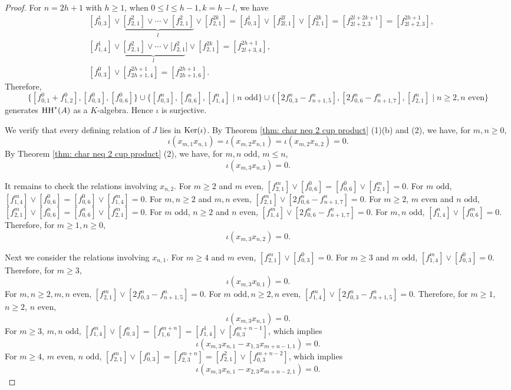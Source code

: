 \documentclass[10pt, reqno]{amsart}
\theoremstyle{definition}
\theoremstyle{remark}
\numberwithin{equation}{section}
\begin{document}
\begin{proof}
For \(n=2h+1 \) with \(h\ge 1\),  when \( 0\le l \le h-1, k=h-l\), we have 
\[ \begin{aligned}
   & [f_{0,3}^1] \lor \underbrace{[f_{2,1}^2] \lor \cdots \lor [f_{2,1}^2]}_{l} \lor [f_{2,1}^{2k}]= [f_{0,3}^1] \lor [f_{2l,1}^{2l}] \lor [f_{2,1}^{2k}]=[f_{2l+2,3}^{2l+2k+1}] =[f_{2l+2,3}^{2h+1}],\\
   & [f_{1,4}^1] \lor \underbrace{[f_{2,1}^2]\lor \cdots \lor [f_{2,1}^2}_{l}] \lor [f_{2,1}^{2k}]= [f_{2l+3,4}^{2h+1}],\\
   & [f_{0,3}^0] \lor [f_{2h+1,4}^{2h+1}] =[f_{2h+1,6}^{2h+1}].
\end{aligned}
\]
Therefore, 
\[ \{[f_{0,1}^0 + f_{1,2}^0], [f_{0,3}^0], [f_{0,6}^0]\}\cup \{[f_{0,3}^n], [f_{0,6}^n], [f_{1,4}^n] \mid  n \text{ odd}\} \cup \{[2f_{0,3}^{n} - f_{n+1,5}^{n}], [2f_{0,6}^{n} - f_{n+1,7}^{n}], [f_{2,1}^{n}] \mid n\ge 2, n \text{ even}\} \]
generates \(\mathrm{HH}^*(A)\) as a \(K\)-algebra.  Hence \(\iota\) is surjective.

We verify that every defining relation of \(J\) lies in \(\mathrm{Ker}(\iota)\). By Theorem \ref{thm: char neq 2 cup product} (1)(b) and (2), we have, for \(m,n \ge 0\),
\[\iota (x_{m,1}x_{n,1}) =\iota (x_{m,2}x_{n,1}) =\iota (x_{m,2}x_{n,2}) =0.\]  
By Theorem \ref{thm: char neq 2 cup product} (2), we have, for \(m,n \text{ odd}\), \(m\le n\), 
\[\iota (x_{m,3}x_{n,3})=0.\]

It remains to check the relations involving \(x_{n,2}\).
For \(m\ge 2\) and \(m \text{ even}\), \([f_{2,1}^m] \lor [f_{0,6}^0] = [f_{0,6}^0] \lor [f_{2,1}^m]= 0\). For \(m \text{ odd}\), \([f_{1,4}^m]\lor [f_{0,6}^0] =[f_{0,6}^0] \lor [f_{1,4}^m]= 0\).
For \(m,n\ge 2\) and \(m, n \text{ even}\), \( [f_{2,1}^m] \lor [2f_{0,6}^n - f_{n+1,7}^n]= 0\). For \(m\ge 2\), \(m \text{ even}\) and \( n \text{ odd}\),
\([f_{2,1}^m] \lor [f_{0,6}^n] = [f_{0,6}^n] \lor [f_{2,1}^m]= 0\). For \(m \text{ odd}\), \(n\ge 2\) and \(n \text{ even}\),
\([f_{1,4}^m] \lor [2f_{0,6}^{n} - f_{n+1,7}^{n}]=0\). For \(m,n \text{ odd}\), \( [f_{1,4}^n]\lor [f_{0,6}^m]=0\). Therefore, for \(m \ge 1, n \ge 0\), 
\[\iota (x_{m,3}x_{n,2}) =0.\] 

Next we consider the relations involving \(x_{n,1}\).
For \(m\ge 4\) and \(m \text{ even}\), \([f_{2,1}^m]\lor [f_{0,3}^0] = 0\). For \( m\ge 3\) and \(m \text{ odd}\), \([f_{1,4}^m] \lor [f_{0,3}^0] = 0\). Therefore, for \( m \ge 3\),
\[\iota (x_{m,3}x_{0,1}) =0.\]
For \(m,n\ge 2, m, n \text{ even}\), \([f_{2,1}^m] \lor [2f_{0,3}^n - f_{n+1,5}^n] = 0\). For \(m \text{ odd}, n\ge 2, n \text{ even}\), \([f_{1,4}^m] \lor [2f_{0,3}^{n} - f_{n+1,5}^{n}]=0\). Therefore, for \(m \ge 1\), \(n\ge 2\),  \(n \text{ even}\), 
\[\iota (x_{m,3}x_{n,1}) =0.\]
For \( m\ge 3\), \(m,n \text{ odd}\), \( [f_{1,4}^m] \lor [f_{0,3}^n]=[f_{1,6}^{m+n}]=[f_{1,4}^1] \lor [f_{0,3}^{m+n-1}]\), which implies 
\[\iota (x_{m,3}x_{n,1}-x_{1,3}x_{m+n-1,1}) =0.\]
For \(m\ge 4\), \(m \text{ even}\), \(n \text{ odd}\), \( [f_{2,1}^m] \lor [f_{0,3}^n]= [f_{2,3}^{m+n}]=[f_{2,1}^2] \lor [f_{0,3}^{m+n-2}]\), which implies 
\[\iota (x_{m,3}x_{n,1}-x_{2,3}x_{m+n-2,1}) =0.\]


\end{proof}
\end{document}

